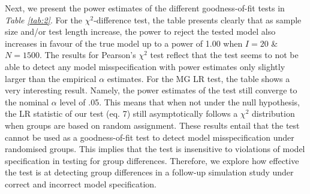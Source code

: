 \documentclass[Royal,sageapa,times,doublespace]{sagej}
\begin{document}
\indent Next, we present the power estimates of the different goodness-of-fit tests in \textit{Table \ref{tab:2}}. For the $\chi^2$-difference test, the table presents clearly that as sample size and/or test length increase, the power to reject the tested model also increases in favour of the true model up to a power of 1.00 when $I = 20$ \& $N = 1500$. The results for Pearson's $\chi^2$ test reflect that the test seems to not be able to detect any model misspecification with power estimates only slightly larger than the empirical $\alpha$ estimates. For the MG LR test, the table shows a very interesting result. Namely, the power estimates of the test still converge to the nominal $\alpha$ level of .05. This means that when not under the null hypothesis, the LR statistic of our test (eq. 7) still asymptotically follows a $\chi^2$ distribution when groups are based on random assignment. These results entail that the test cannot be used as a goodness-of-fit test to detect model misspecification under randomised groups. This implies that the test is insensitive to violations of model specification in testing for group differences. Therefore, we explore how effective the test is at detecting group differences in a follow-up simulation study under correct and incorrect model specification.
\end{document}
